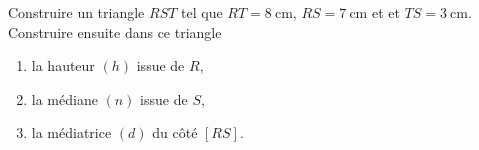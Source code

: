 
\begin{exercice}\label{exosmath-0922}

    Construire un triangle $RST$ tel que $RT = \SI{8}{\centi\meter}$,  $RS = \SI{7}{\centi\meter}$ et et $TS = \SI{3}{\centi\meter}$. Construire ensuite dans ce triangle 
    \begin{enumerate}
        \item
            la hauteur \( (h)\) issue de \( R\),
        \item
            la médiane \( (n)\) issue de \( S\),
        \item
            la médiatrice \( (d)\) du côté \( [RS]\).
    \end{enumerate}

\end{exercice}
